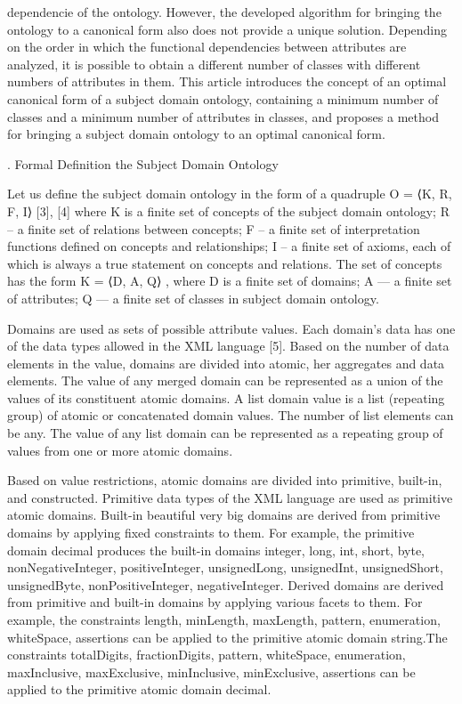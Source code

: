 \documentclass[10pt]{article}
\newcommand{\RomanNumeralCaps}[1]
    {\MakeUppercase{\romannumeral 1}}
\begin{document}
\begin{multicols}{2}
dependencie of the
ontology. However, the developed algorithm for bringing
the ontology to a canonical form also does not provide
a unique solution. Depending on the order in which the
functional dependencies between attributes are analyzed,
it is possible to obtain a different number of classes
with different numbers of attributes in them. This article
introduces the concept of an optimal canonical form of a
subject domain ontology, containing a minimum number
of classes and a minimum number of attributes in classes,
and proposes a method for bringing a subject domain
ontology to an optimal canonical form.
\begin{center}
   \RomanNumeralCaps{1}\RomanNumeralCaps{1}. Formal Definition the Subject Domain Ontology
\end{center}
Let us define the subject domain ontology in the form
of a quadruple O = ⟨K, R, F, I⟩ [3], [4] where K is a
finite set of concepts of the subject domain ontology; R
– a finite set of relations between concepts; F – a finite
set of interpretation functions defined on concepts and
relationships; I – a finite set of axioms, each of which is
always a true statement on concepts and relations. The
set of concepts has the form K = ⟨D, A, Q⟩ , where D
is a finite set of domains; A — a finite set of attributes;
Q — a finite set of classes in subject domain ontology.

Domains are used as sets of possible attribute values.
Each domain’s data has one of the data types allowed
in the XML language [5]. Based on the number of data
elements in the value, domains are divided into atomic,
her aggregates and data elements. The
value of any merged domain can be represented as a
union of the values of its constituent atomic domains. A
list domain value is a list (repeating group) of atomic
or concatenated domain values. The number of list elements can be any. The value of any list domain can be
represented as a repeating group of values from one or
more atomic domains.

Based on value restrictions, atomic domains are divided into primitive, built-in, and constructed. Primitive
data types of the XML language are used as primitive atomic domains. Built-in beautiful very big domains are derived from
primitive domains by applying fixed constraints to them.
For example, the primitive domain decimal produces the
built-in domains integer, long, int, short, byte, nonNegativeInteger, positiveInteger, unsignedLong, unsignedInt,
unsignedShort, unsignedByte, nonPositiveInteger, negativeInteger. Derived domains are derived from primitive and built-in domains by applying various facets to
them. For example, the constraints length, minLength,
maxLength, pattern, enumeration, whiteSpace, assertions
can be applied to the primitive atomic domain string.The
\newpage 
\fancyhf{}
\fancyhead{+20pt}
 constraints totalDigits, fractionDigits, pattern, whiteSpace, enumeration, maxInclusive, maxExclusive, minInclusive, minExclusive, assertions can be applied to the
primitive atomic domain decimal.


\end{multicols}
\end{document}

